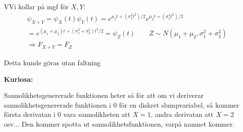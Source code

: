 \par\bigskip
\begin{prf}
  VVi kollar på mgf för $X,Y$:
  \begin{equation*}
    \begin{gathered}
      \psi_{X+Y} = \psi_X(t)\psi_Y(t) = e^{\mu_1t+(\sigma_1^2t^2)/2}e^{\mu_2t+(\sigma_2^2t^2)/2}\\
      = e^{(\mu_1+\mu_2)t+(\sigma_1^2+\sigma_2^2)t^2/2} = \psi_Z(t)\qquad Z\sim N(\mu_1+\mu_2,\sigma_1^2+\sigma_2^2)\\
      \Rightarrow F_{X+Y} = F_Z
    \end{gathered}
  \end{equation*}
  \par\bigskip
  \noindent Detta kunde göras utan faltning
\end{prf}
\par\bigskip
\noindent\textbf{Kuriosa:}\par
\noindent Sannolikhetsgenererade funktionen heter så för att om vi deriverar sannolikhetsgenererade funktionen i 0 för en diskret slumpvariabel, så kommer första derivatan i 0 vara sannolikheten att $X=1$, andra derivatan att $X=2$ osv... Den kommer spotta ut sannolikhetsfunktionen, varpå namnet kommer. 
